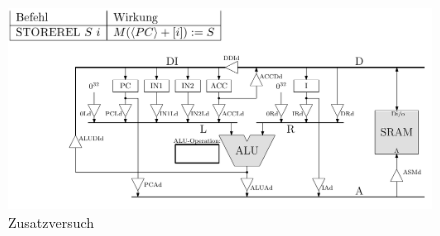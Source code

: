 \documentclass{scrartcl}[9pt, a4paper]
\begin{document}
\begin{figure}[h]
	\centering
	\includegraphics[width=.9\textwidth]{figs/storerel}
	\caption{Zusatzversuch}
\end{figure}
\end{document}
